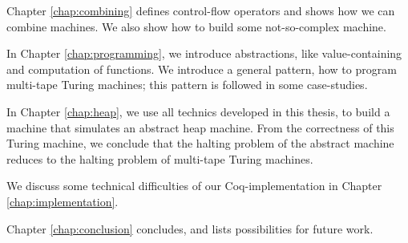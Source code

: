 Chapter \ref{chap:combining} defines control-flow operators and shows how we can combine machines.  We also show how to build some not-so-complex
machine.

In Chapter \ref{chap:programming}, we introduce abstractions, like value-containing and computation of functions.  We introduce a general pattern, how
to program multi-tape Turing machines; this pattern is followed in some case-studies.

In Chapter \ref{chap:heap}, we use all technics developed in this thesis, to build a machine that simulates an abstract heap machine.  From the
correctness of this Turing machine, we conclude that the halting problem of the abstract machine reduces to the halting problem of multi-tape Turing
machines.

We discuss some technical difficulties of our Coq-implementation in Chapter \ref{chap:implementation}.

Chapter \ref{chap:conclusion} concludes, and lists possibilities for future work.



